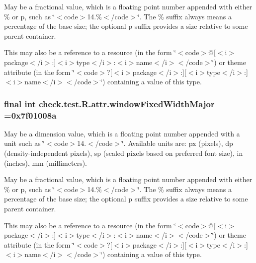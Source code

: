 May be a fractional value, which is a floating point number appended with either \% or p, such as \char`\"{}$<$code$>$14.\%$<$/code$>$\char`\"{}. The \% suffix always means a percentage of the base size; the optional p suffix provides a size relative to some parent container. 

This may also be a reference to a resource (in the form \char`\"{}$<$code$>$@\mbox{[}$<$i$>$package$<$/i$>$\+:\mbox{]}$<$i$>$type$<$/i$>$\+:$<$i$>$name$<$/i$>$$<$/code$>$\char`\"{}) or theme attribute (in the form \char`\"{}$<$code$>$?\mbox{[}$<$i$>$package$<$/i$>$\+:\mbox{]}\mbox{[}$<$i$>$type$<$/i$>$\+:\mbox{]}$<$i$>$name$<$/i$>$$<$/code$>$\char`\"{}) containing a value of this type. \hypertarget{classcheck_1_1test_1_1_r_1_1attr_a9cff73eb6499ce956f00b5e14b6b15fc}{}
\subsubsection[{window\+Fixed\+Width\+Major}]{\setlength{\rightskip}{0pt plus 5cm}final int check.\+test.\+R.\+attr.\+window\+Fixed\+Width\+Major =0x7f01008a\hspace{0.3cm}{\ttfamily [static]}}\label{classcheck_1_1test_1_1_r_1_1attr_a9cff73eb6499ce956f00b5e14b6b15fc}
May be a dimension value, which is a floating point number appended with a unit such as \char`\"{}$<$code$>$14.\+5sp$<$/code$>$\char`\"{}. Available units are\+: px (pixels), dp (density-\/independent pixels), sp (scaled pixels based on preferred font size), in (inches), mm (millimeters). 

May be a fractional value, which is a floating point number appended with either \% or p, such as \char`\"{}$<$code$>$14.\%$<$/code$>$\char`\"{}. The \% suffix always means a percentage of the base size; the optional p suffix provides a size relative to some parent container. 

This may also be a reference to a resource (in the form \char`\"{}$<$code$>$@\mbox{[}$<$i$>$package$<$/i$>$\+:\mbox{]}$<$i$>$type$<$/i$>$\+:$<$i$>$name$<$/i$>$$<$/code$>$\char`\"{}) or theme attribute (in the form \char`\"{}$<$code$>$?\mbox{[}$<$i$>$package$<$/i$>$\+:\mbox{]}\mbox{[}$<$i$>$type$<$/i$>$\+:\mbox{]}$<$i$>$name$<$/i$>$$<$/code$>$\char`\"{}) containing a value of this type. \hypertarget{classcheck_1_1test_1_1_r_1_1attr_a7a67f15de710341d2d449dc94d1f781d}{}
